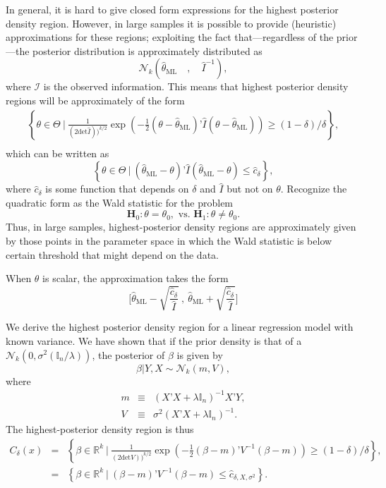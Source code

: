 \documentclass[11pt]{article} %
\begin{document}
In general, it is hard to give closed form expressions for the highest posterior density region. However, in large samples it is possible to provide (heuristic) approximations for these regions; exploiting the fact that---regardless of the prior---the posterior distribution is approximately distributed as
\[  \mathcal{N}_{k} \left(  \widehat{\theta}_{\textrm{ML}} \quad, \quad \widehat{I}^{-1} \right),   \]
\noindent where $\mathcal{I}$ is the observed information. This means that highest posterior density regions will be approximately of the form 
\begin{eqnarray*}
\left \{ \theta \in \Theta \: \Bigg | \:  \frac{1}{ (2 \textrm{det} \widehat{I}))^{k/2} } \exp \left( -\frac{1}{2} (\theta - \widehat{\theta}_{\textrm{ML}}) ’\widehat{I}   (\theta - \widehat{\theta}_{\textrm{ML}})\right)  \geq (1-\delta)/\delta \right \}, \\
\end{eqnarray*}
which can be written as 
\[ \left \{ \theta \in \Theta \: \Bigg | \:  (\widehat{\theta}_{\textrm{ML}} - \theta) ’\widehat{I}   (\widehat{\theta}_{\textrm{ML}}-\theta)   \leq \widehat{c}_{\delta} \right \}, 
\]
\noindent where $\widehat{c}_{\delta}$ is some function that depends on $\delta$ and $\widehat{I}$ but not on $\theta$. Recognize the quadratic form as the Wald statistic for the problem
\[ \mathbf{H}_0: \theta = \theta_0, \textrm{ vs. } \mathbf{H}_1: \theta \neq \theta_0. \]
Thus, in large samples, highest-posterior density regions are approximately given by those points in the parameter space in which the Wald statistic is below certain threshold that might depend on the data. 

When $\theta$ is scalar, the approximation takes the form
\[ \Big[ \widehat{\theta}_{\textrm{ML}} - \sqrt{\frac{\widehat{c}_{\delta}}{\widehat{I}}} \:, \: \widehat{\theta}_{\textrm{ML}} + \sqrt{\frac{\widehat{c}_{\delta}}{\widehat{I}}} \Big]  \]


 We derive the highest posterior density region for a linear regression model with known variance. We have shown that if the prior density is that of a $\mathcal{N}_{k}(0, \sigma^2 (\mathbb{I}_n/\lambda))$, the posterior of $\beta$ is given by
\[  \beta | Y, X \sim \mathcal{N}_{k} ( m , V   ),  \]
where 
\begin{eqnarray*}
m  &\equiv& (X’X + \lambda \mathbb{I}_n)^{-1} X’Y, \\
V  & \equiv & \sigma^2  (X’X + \lambda \mathbb{I}_n)^{-1}.
\end{eqnarray*}
\noindent The highest-posterior density region is thus 
\begin{eqnarray*}
C_{\delta}(x) &= & \left \{ \beta \in \mathbb{R}^{k} \: \Big | \:  \frac{1}{ (2 \textrm{det} V))^{k/2} } \exp \left( -\frac{1}{2 } (\beta - m) ’V^{-1}  (\beta - m) \right)  \geq (1-\delta)/\delta \right \}, \\
&=&  \left \{ \beta \in \mathbb{R}^{k} \: \Big | \:   (\beta - m) ’V^{-1}  (\beta - m)  \leq \widehat{c}_{\delta,X,\sigma^2} \right \}.
\end{eqnarray*}
\end{document}
